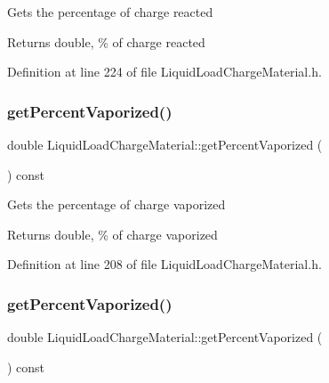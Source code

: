 Gets the percentage of charge reacted \begin{DoxyReturn}{Returns}
double, \% of charge reacted 
\end{DoxyReturn}


Definition at line 224 of file Liquid\+Load\+Charge\+Material.\+h.

\mbox{\label{class_liquid_load_charge_material_a8e55b0df0a0551671636bcf169228dca}} 
\subsubsection{\texorpdfstring{get\+Percent\+Vaporized()}{getPercentVaporized()}\hspace{0.1cm}{\footnotesize\ttfamily [1/3]}}
{\footnotesize\ttfamily double Liquid\+Load\+Charge\+Material\+::get\+Percent\+Vaporized (\begin{DoxyParamCaption}{ }\end{DoxyParamCaption}) const\hspace{0.3cm}{\ttfamily [inline]}}

Gets the percentage of charge vaporized \begin{DoxyReturn}{Returns}
double, \% of charge vaporized 
\end{DoxyReturn}


Definition at line 208 of file Liquid\+Load\+Charge\+Material.\+h.

\mbox{\label{class_liquid_load_charge_material_a8e55b0df0a0551671636bcf169228dca}} 
\subsubsection{\texorpdfstring{get\+Percent\+Vaporized()}{getPercentVaporized()}\hspace{0.1cm}{\footnotesize\ttfamily [2/3]}}
{\footnotesize\ttfamily double Liquid\+Load\+Charge\+Material\+::get\+Percent\+Vaporized (\begin{DoxyParamCaption}{ }\end{DoxyParamCaption}) const\hspace{0.3cm}{\ttfamily [inline]}}

